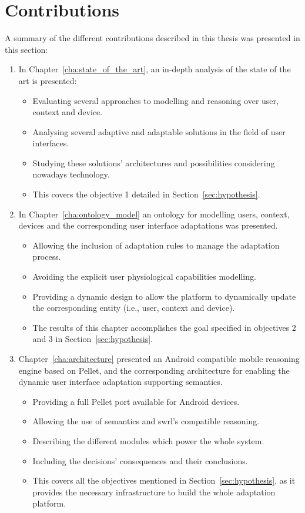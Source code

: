 \section{Contributions}
\label{sec:contributions}

A summary of the different contributions described in this thesis was presented 
in this section: 

\begin{enumerate}[label=\alph*)]
  \item In Chapter~\ref{cha:state_of_the_art}, an in-depth analysis of the state 
  of the art is presented:
  \begin{itemize}
    \item Evaluating several approaches to modelling and reasoning over user,
    context and device.
    \item Analysing several adaptive and adaptable solutions in the field of
    user interfaces.
    \item Studying these solutions' architectures and possibilities considering
    nowadays technology.
    \item This covers the objective 1 detailed in Section~\ref{sec:hypothesis}.
  \end{itemize}
  
  \item In Chapter~\ref{cha:ontology_model} an ontology for modelling users, 
  context, devices and the corresponding user interface adaptations was presented.
  \begin{itemize}
    \item Allowing the inclusion of adaptation rules to manage the adaptation 
    process.
    \item Avoiding the explicit user physiological capabilities modelling.
    \item Providing a dynamic design to allow the platform to dynamically update
    the corresponding entity (i.e., user, context and device).
    \item The results of this chapter accomplishes the goal specified in
    objectives 2 and 3 in Section~\ref{sec:hypothesis}.
  \end{itemize}

  \item Chapter~\ref{cha:architecture} presented an Android compatible mobile 
  reasoning engine based on Pellet, and the corresponding architecture
  for enabling the dynamic user interface adaptation supporting semantics.
  \begin{itemize}
    \item Providing a full Pellet port available for Android devices.
    \item Allowing the use of semantics and \ac{swrl}'s compatible reasoning.
    \item Describing the different modules which power the whole system.
    \item Including the decisions' consequences and their conclusions.
    \item This covers all the objectives mentioned in Section~\ref{sec:hypothesis},
    as it provides the necessary infrastructure to build the whole adaptation
    platform.
  \end{itemize}


\end{enumerate}
